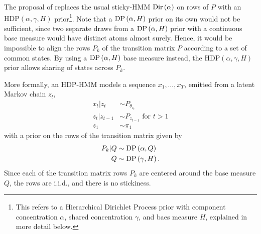 \documentclass[14pt]{extarticle}
\begin{document}
The proposal of \citep{teh2006hierarchical} replaces the usual sticky-HMM
$\textnormal{Dir}\left(\alpha\right)$ on rows of $P$ with an $\text{HDP}\left(\alpha,
\gamma, H\right)$ prior\footnote{This refers to a Hierarchical Dirichlet Process
  prior with component concentration $\alpha$, shared concentration $\gamma$,
  and baes measure $H$, explained in more detail below.}. Note that a
$\textnormal{DP}\left(\alpha, H\right)$ prior on its own would not be sufficient, since two
separate draws from a $\textnormal{DP}\left(\alpha, H\right)$ prior with a continuous base
measure would have distinct atoms almost surely. Hence, it would be impossible
to align the rows $P_{k}$ of the transition matrix $P$ according to a set of
common states. By using a $\textnormal{DP}\left(\alpha, H\right)$ base measure instead, the
$\text{HDP}\left(\alpha, \gamma, H\right)$ prior allows sharing of states across
$P_{k}$.

More formally, an HDP-HMM models a sequence $x_{1}, \dots, x_{T}$, emitted from
a latent Markov chain $z_t$,
\begin{align*}
  x_t \vert z_t &\sim P_{\theta_{z_t}} \\
  z_t \vert z_{t - 1} &\sim P_{z_{t - 1}} \text{ for } t > 1 \\
  z_1 &\sim \pi_1
\end{align*}
with a prior on the rows of the transition matrix given by
\begin{align*}
  P_k \vert Q &\sim \textnormal{DP}\left(\alpha, Q\right) \\
  Q &\sim \textnormal{DP}\left(\gamma, H\right).
\end{align*}
Since each of the transition matrix rows $P_k$ are centered around the base
measure $Q$, the rows are i.i.d., and there is no stickiness.
\end{document}
